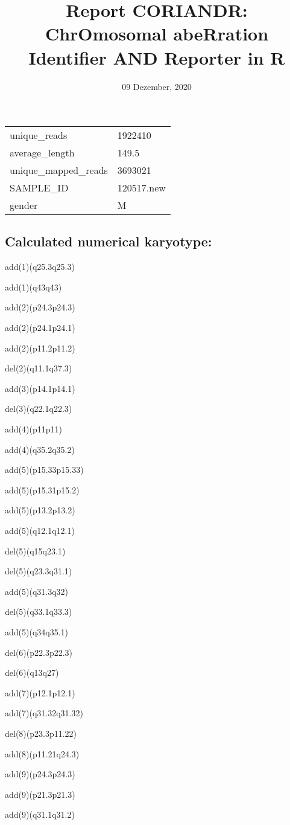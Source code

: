 \documentclass[]{article}
\title{Report CORIANDR: ChrOmosomal abeRration Identifier AND Reporter in R}
\author{}
\date{09 Dezember, 2020}
\begin{document}
\maketitle

\begin{longtable}[]{@{}ll@{}}
\toprule
\endhead
unique\_reads & 1922410\tabularnewline
average\_length & 149.5\tabularnewline
unique\_mapped\_reads & 3693021\tabularnewline
SAMPLE\_ID & 120517.new\tabularnewline
gender & M\tabularnewline
\bottomrule
\end{longtable}

\hypertarget{calculated-numerical-karyotype}{%
\subsection{Calculated numerical
karyotype:}\label{calculated-numerical-karyotype}}

add(1)(q25.3q25.3)

add(1)(q43q43)

add(2)(p24.3p24.3)

add(2)(p24.1p24.1)

add(2)(p11.2p11.2)

del(2)(q11.1q37.3)

add(3)(p14.1p14.1)

del(3)(q22.1q22.3)

add(4)(p11p11)

add(4)(q35.2q35.2)

add(5)(p15.33p15.33)

add(5)(p15.31p15.2)

add(5)(p13.2p13.2)

add(5)(q12.1q12.1)

del(5)(q15q23.1)

del(5)(q23.3q31.1)

add(5)(q31.3q32)

del(5)(q33.1q33.3)

add(5)(q34q35.1)

del(6)(p22.3p22.3)

del(6)(q13q27)

add(7)(p12.1p12.1)

add(7)(q31.32q31.32)

del(8)(p23.3p11.22)

add(8)(p11.21q24.3)

add(9)(p24.3p24.3)

add(9)(p21.3p21.3)

add(9)(q31.1q31.2)
\end{document}
